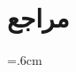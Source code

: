 \renewcommand{\bibname}{مراجع}	
{\normalfont\huge\bfseries\RTL}
\chapter*{\vspace*{8cm}مراجع}
\baselineskip=.6cm
\newpage
\begin{LTRitems}
	\resetlatinfont
	\begingroup
	\def\chapter*#1{}
	‎‎
	{\footnotesize}
	\endgroup
\end{LTRitems}

\baselineskip=0.67cm